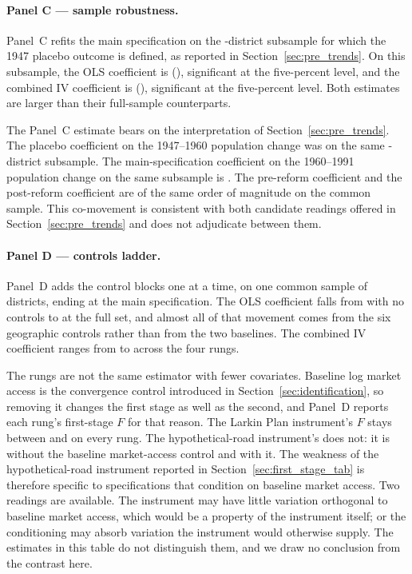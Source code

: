 \paragraph{Panel C --- sample robustness.}
Panel~C refits the main specification on the \placeboNIVBoth{}-district subsample
for which the 1947 placebo outcome is defined, as reported in
Section~\ref{sec:pre_trends}. On this subsample, the OLS coefficient
is \subOLSCoef{} (\subOLSSE{}), significant at the five-percent level, and the
combined IV coefficient is \subIVBCoef{} (\subIVBSE{}), significant at the
five-percent level. Both estimates are larger than their
full-sample counterparts.

The Panel~C estimate bears on the interpretation of
Section~\ref{sec:pre_trends}. The placebo coefficient on the
1947--1960 population change was \placeboCoefIVBoth{} on the same
\placeboNIVBoth{}-district
subsample. The main-specification coefficient on the 1960--1991
population change on the same subsample is \subIVBCoef{}. The pre-reform
coefficient and the post-reform coefficient are of the same order
of magnitude on the common sample. This co-movement is consistent
with both candidate readings offered in Section~\ref{sec:pre_trends}
and does not adjudicate between them.

\paragraph{Panel D --- controls ladder.}
Panel~D adds the control blocks one at a time, on one common sample of
\ladderN{} districts, ending at the main specification. The OLS
coefficient falls from \ladderOLSNoCtrl{} with no controls to
\popOLSCoef{} at the full set, and almost all of that movement comes
from the six geographic controls rather than from the two baselines.
The combined IV coefficient ranges from \ladderIVBMin{} to
\ladderIVBMax{} across the four rungs.

The rungs are not the same estimator with fewer covariates. Baseline
log market access is the convergence control introduced in
Section~\ref{sec:identification}, so removing it changes the first
stage as well as the second, and Panel~D reports each rung's
first-stage $F$ for that reason. The Larkin Plan instrument's $F$ stays
between \ladderLPFMin{} and \ladderLPFMax{} on every rung. The
hypothetical-road instrument's does not: it is \ladderHypoFNoMA{}
without the baseline market-access control and \ladderHypoFWithMA{}
with it. The weakness of the hypothetical-road instrument reported in
Section~\ref{sec:first_stage_tab} is therefore specific to
specifications that condition on baseline market access. Two readings
are available. The instrument may have little variation orthogonal to
baseline market access, which would be a property of the instrument
itself; or the conditioning may absorb variation the instrument would
otherwise supply. The estimates in this table do not distinguish them,
and we draw no conclusion from the contrast here.

